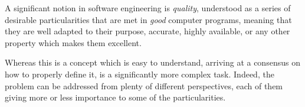 

A significant notion in software engineering is \textit{quality}, understood as a series of desirable particularities that are met in \textit{good} computer programs, meaning that they are well adapted to their purpose, accurate, highly available, or any other property which makes them excellent.

Whereas this is a concept which is easy to understand, arriving at a consensus on how to properly define it, is a significantly more complex task. Indeed, the problem can be addressed from plenty of different perspectives, each of them giving more or less importance to some of the particularities.

